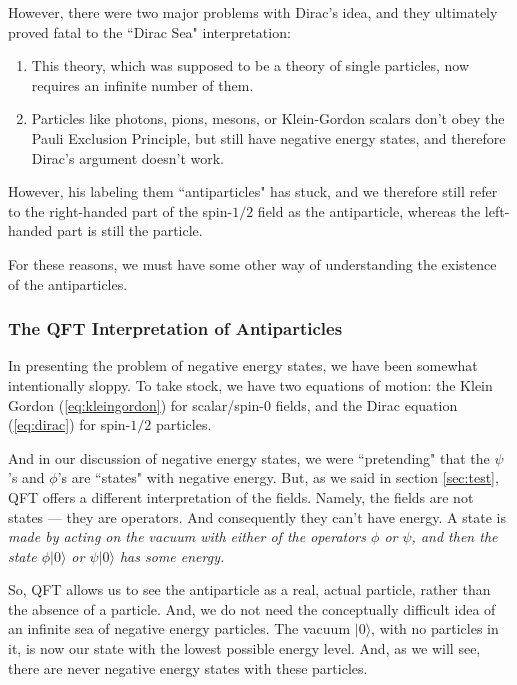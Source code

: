 \documentclass[12pt,epsf]{article}
\begin{document}
However, there were two major problems with Dirac's idea, and they
ultimately proved fatal to the ``Dirac Sea" interpretation:
\begin{enumerate}
\item This theory, which was supposed to be a theory of single
particles, now requires an infinite number of them.
\item Particles like photons, pions, mesons, or Klein-Gordon
scalars don't obey the Pauli Exclusion Principle, but still have
negative energy states, and therefore Dirac's argument doesn't work.  
\end{enumerate}

However, his labeling them ``antiparticles" has stuck, and we therefore
still refer to the right-handed part of the spin-$1/2$ field as the
antiparticle, whereas the left-handed part is still the particle.  

For these reasons, we must have some other way of understanding the
existence of the antiparticles.  

\subsubsection{The QFT Interpretation of Antiparticles}

In presenting the problem of negative energy states, we have been
somewhat intentionally sloppy.	To take stock, we have two equations of
motion: the Klein Gordon (\ref{eq:kleingordon}) for scalar/spin-0
fields, and the Dirac equation (\ref{eq:dirac}) for spin-$1/2$
particles.  

And in our discussion of negative energy states, we were ``pretending"
that the $\psi$'s and $\phi$'s are ``states" with negative energy. 
But, as we said in section \ref{sec:test}, QFT offers a different
interpretation of the fields.  Namely, the fields are not states --- they
are operators.	And consequently they can't have energy.  A state is
\it made \rm by acting on the vacuum with either of the \it operators
\rm $\phi$ or $\psi$, and then the state $\phi|0\rangle$ or
$\psi|0\rangle$ has some energy.  

So, QFT allows us to see the antiparticle as a real, actual particle,
rather than the absence of a particle.	And, we do not need the
conceptually difficult idea of an infinite sea of negative energy
particles.  The vacuum $|0\rangle$, with no particles in it, is now our
state with the lowest possible energy level.  And, as we will see,
there are never negative energy states with these particles.  
\end{document}
